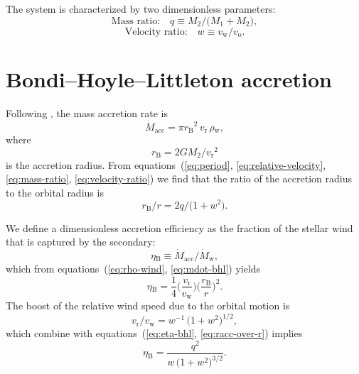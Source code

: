 \documentclass[useAMS, usenatbib, a4paper]{mnras}
\newcommand\wind{\ensuremath{_{\mathrm{w}}}}
\newcommand\mdwind{\ensuremath{\dot M\wind}}
\newcommand\orb{\ensuremath{_{\mathrm{o}}}}
\newcommand\rel{\ensuremath{_{\mathrm{r}}}}
\newcommand\bhl{\ensuremath{_{\mathrm{\scriptscriptstyle B}}}}
\newcommand\acc{\ensuremath{_{\mathrm{acc}}}}
\newcommand\mdacc{\ensuremath{\dot M\acc}}
\begin{document}
The system is characterized by two dimensionless parameters:
\begin{equation}
  \label{eq:mass-ratio}
  \text{Mass ratio:}\quad q \equiv M_2 / \bigl(M_1 + M_2\bigr),
\end{equation}
\begin{equation}
  \label{eq:velocity-ratio}
  \text{Velocity ratio:}\quad w \equiv v\wind / v\orb.
\end{equation}

\section{Bondi--Hoyle--Littleton accretion}
\label{sec:bondi-hoyle-littl}

Following \citet{Hoyle:1939a, Bondi:1944a},
the mass accretion rate is
\begin{equation}
  \label{eq:mdot-bhl}
  \mdacc = \pi r\bhl^2 \, v\rel \, \rho\wind , 
\end{equation}
where
\begin{equation}
  \label{eq:radius-bhl}
  r\bhl = 2 G M_2 / v\rel^2 
\end{equation}
is the accretion radius.
From equations~(\ref{eq:period}, \ref{eq:relative-velocity}, \ref{eq:mass-ratio}, \ref{eq:velocity-ratio}) we find that the ratio of the accretion radius to the orbital radius is
\begin{equation}
  \label{eq:racc-over-r}
  r\bhl / r = 2 q / \bigl(1 + w^2\bigr).
\end{equation}

We define a dimensionless accretion efficiency as the fraction of the stellar wind that is captured by the secondary:
\begin{equation}
  \label{eq:eta-bhl-def}
  \eta\bhl \equiv \mdacc / \mdwind ,
\end{equation}
which from equations~(\ref{eq:rho-wind}, \ref{eq:mdot-bhl}) yields
\begin{equation}
  \label{eq:eta-bhl}
  \eta\bhl = \frac{1}{4}
  \biggl( \frac{v\rel}{v\wind} \biggr)
  \biggl( \frac{r\bhl}{r}\biggr)^2 . 
\end{equation}
The boost of the relative wind speed due to the orbital motion is
\begin{equation}
  \label{eq:boost-ratio}
  v\rel / v\wind =  w^{-1} \, \bigl(1 + w^2\bigr)^{1/2} ,
\end{equation}
which combine with equations~(\ref{eq:eta-bhl}, \ref{eq:racc-over-r}) implies
\begin{equation}
  \label{eq:eta-bhl-dimensionless}
  \eta\bhl = \frac{q^2}{w \, \bigl(1 + w^2\bigr)^{3/2}} .
\end{equation}
\end{document}
